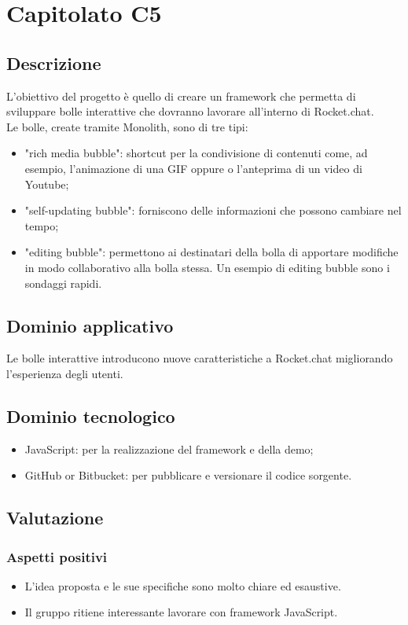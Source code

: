 \section {Capitolato C5}
	\subsection {Descrizione}
		L'obiettivo del progetto è quello di creare un framework che permetta di sviluppare bolle interattive che dovranno lavorare all'interno di Rocket.chat. \\
		Le bolle, create tramite Monolith, sono di tre tipi:
		\begin{itemize}
			\item "rich media bubble": shortcut per la condivisione di contenuti come, ad esempio, l'animazione di una GIF oppure o l'anteprima di un video di Youtube;
			\item "self-updating bubble": forniscono delle informazioni che possono cambiare nel tempo;
			\item "editing bubble": permettono ai destinatari della bolla di apportare modifiche in modo collaborativo alla bolla stessa. Un esempio di editing bubble sono i sondaggi rapidi.
		\end{itemize}
	\subsection {Dominio applicativo}
		Le bolle interattive introducono nuove caratteristiche a Rocket.chat migliorando l'esperienza degli utenti.
	\subsection {Dominio tecnologico}
		\begin{itemize}
		\item JavaScript: per la realizzazione del framework e della demo;
		\item GitHub or Bitbucket: per pubblicare e versionare il codice sorgente.
		\end{itemize}
	\subsection {Valutazione}
		\subsubsection {Aspetti positivi}
			\begin{itemize}
				\item L’idea proposta e le sue specifiche sono molto chiare ed esaustive.
				\item Il gruppo ritiene interessante lavorare con framework JavaScript.
			\end{itemize}
